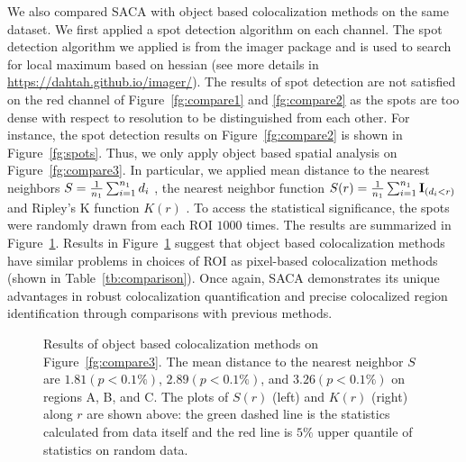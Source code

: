 \documentclass[10pt,twocolumn,twoside]{IEEEtran}
\begin{document}
We also compared SACA with object based colocalization methods on the same dataset. We first applied a spot detection algorithm on each channel. The spot detection algorithm we applied is from the imager package and is used to search for local maximum based on hessian (see more details in \url{https://dahtah.github.io/imager/}). The results of spot detection are not satisfied on the red channel of Figure~\ref{fg:compare1} and \ref{fg:compare2} as the spots are too dense with respect to resolution to be distinguished from each other. For instance, the spot detection results on Figure~\ref{fg:compare2} is shown in Figure~\ref{fg:spots}. Thus, we only apply object based spatial analysis on Figure~\ref{fg:compare3}. In particular, we applied mean distance to the nearest neighbors $S={1\over n_1}\sum_{i=1}^{n_1}d_i$ \cite{clark1954distance,Lagache2015}, the nearest neighbor function $S(r)={1\over n_1}\sum_{i=1}^{n_1}\mathbf{I}_{(d_i<r)}$ \cite{Helmuth2010,torquato1990nearest,Lagache2015} and Ripley's K function $K(r)$ \cite{lagache2013statistical,lagache2018mapping,Lagache2015}. To access the statistical significance, the spots were randomly drawn from each ROI $1000$ times. The results are summarized in Figure~\ref{fg:objectcompare}. Results in Figure~\ref{fg:objectcompare} suggest that object based colocalization methods have similar problems in choices of ROI as pixel-based colocalization methods (shown in Table~\ref{tb:comparison}). Once again, SACA demonstrates its unique advantages in robust colocalization quantification and precise colocalized region identification through comparisons with previous methods. 


\begin{figure}[h!]
    \centering
    \caption{Results of object based colocalization methods on Figure~\ref{fg:compare3}. The mean distance to the nearest neighbor $S$ are $1.81 (p<0.1\%)$, $2.89 (p<0.1\%)$, and $3.26 (p<0.1\%)$ on regions A, B, and C. The plots of $S(r)$ (left) and $K(r)$ (right) along $r$ are shown above: the green dashed line is the statistics calculated from data itself and the red line is $5\%$ upper quantile of statistics on random data.}\label{fg:objectcompare}
\end{figure}
\end{document}
